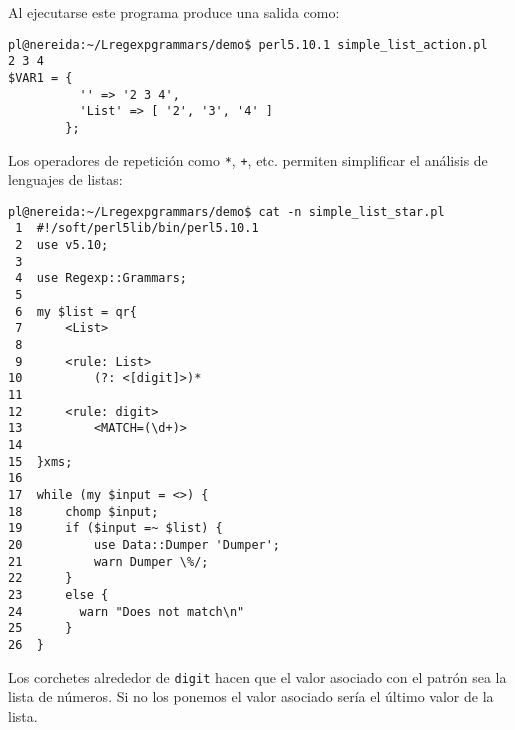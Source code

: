 Al ejecutarse este programa produce una salida como:

\begin{verbatim}
pl@nereida:~/Lregexpgrammars/demo$ perl5.10.1 simple_list_action.pl
2 3 4
$VAR1 = {
          '' => '2 3 4',
          'List' => [ '2', '3', '4' ]
        };
\end{verbatim}


Los operadores de repetición como \verb|*|, \verb|+|, etc. 
permiten simplificar el análisis de lenguajes de listas:
\begin{verbatim}
pl@nereida:~/Lregexpgrammars/demo$ cat -n simple_list_star.pl
 1  #!/soft/perl5lib/bin/perl5.10.1
 2  use v5.10;
 3
 4  use Regexp::Grammars;
 5
 6  my $list = qr{
 7      <List>
 8
 9      <rule: List>
10          (?: <[digit]>)*
11
12      <rule: digit>
13          <MATCH=(\d+)>
14
15  }xms;
16
17  while (my $input = <>) {
18      chomp $input;
19      if ($input =~ $list) {
20          use Data::Dumper 'Dumper';
21          warn Dumper \%/;
22      }
23      else {
24        warn "Does not match\n"
25      }
26  }
\end{verbatim}
Los corchetes alrededor de \verb|digit| hacen 
que el valor asociado con el patrón sea la lista de números.
Si no los ponemos el valor asociado sería el último valor de la lista.



